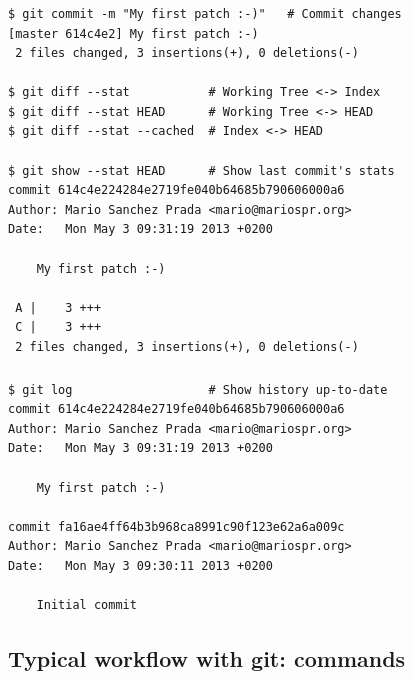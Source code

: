 \begin{frame}[fragile]
  \frametitle{\insertsubsection}

  \begin{small}
\begin{verbatim}
$ git commit -m "My first patch :-)"   # Commit changes
[master 614c4e2] My first patch :-)
 2 files changed, 3 insertions(+), 0 deletions(-)

$ git diff --stat           # Working Tree <-> Index
$ git diff --stat HEAD      # Working Tree <-> HEAD
$ git diff --stat --cached  # Index <-> HEAD

$ git show --stat HEAD      # Show last commit's stats
commit 614c4e224284e2719fe040b64685b790606000a6
Author: Mario Sanchez Prada <mario@mariospr.org>
Date:   Mon May 3 09:31:19 2013 +0200

    My first patch :-)

 A |    3 +++
 C |    3 +++
 2 files changed, 3 insertions(+), 0 deletions(-)
\end{verbatim}
  \end{small}
\end{frame}
\begin{frame}[fragile]
  \frametitle{\insertsubsection}

  \begin{small}
\begin{verbatim}
$ git log                   # Show history up-to-date
commit 614c4e224284e2719fe040b64685b790606000a6
Author: Mario Sanchez Prada <mario@mariospr.org>
Date:   Mon May 3 09:31:19 2013 +0200

    My first patch :-)

commit fa16ae4ff64b3b968ca8991c90f123e62a6a009c
Author: Mario Sanchez Prada <mario@mariospr.org>
Date:   Mon May 3 09:30:11 2013 +0200

    Initial commit
\end{verbatim}
  \end{small}

\end{frame}


\subsection{Typical workflow with git: commands}

